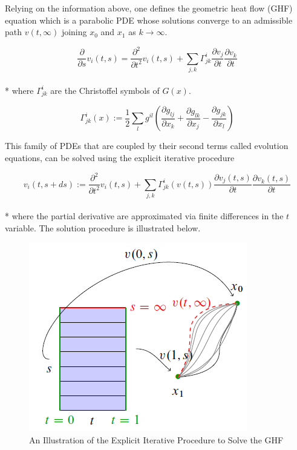 \documentclass[letterpaper, 10 pt, conference]{ieeeconf}
\begin{document}
Relying on the information above, one defines the geometric heat flow (GHF) equation which is a parabolic PDE whose solutions converge to an admissible path $v(t, \infty)$ joining $x_0$ and $x_1$ as $k \rightarrow \infty$.

\begin{equation}
\frac{\partial}{\partial s} v_{i}(t, s)=\frac{\partial^{2}}{\partial t^{2}} v_{i}(t, s)+\sum_{j, k} \Gamma_{j k}^{i} \frac{\partial v_{j}}{\partial t} \frac{\partial v_{k}}{\partial t}
\end{equation}
\\*
where $\Gamma_{j k}^{i}$ are the Christoffel symbols of $G(x)$.

\begin{equation}
\Gamma_{j k}^{i}(x):=\frac{1}{2} \sum_{l} g^{i l}\left(\frac{\partial g_{l j}}{\partial x_{k}}+\frac{\partial g_{l k}}{\partial x_{j}}-\frac{\partial g_{j k}}{\partial x_{l}}\right)
\end{equation}

This family of PDEs that are coupled by their second terms called evolution equations, can be solved using the explicit iterative procedure

\begin{equation}
v_{i}(t, s+d s):=\frac{\partial^{2}}{\partial t^{2}} v_{i}(t, s) 
+\sum_{j, k} \Gamma_{j k}^{i}(v(t, s)) \frac{\partial v_{j}(t, s)}{\partial t} \frac{\partial v_{k}(t, s)}{\partial t}
\end{equation}
\\*
where the partial derivative are approximated via finite differences in the $t$ variable. The solution procedure is illustrated below.
\begin{figure}[htbp]
\centering
\captionsetup{justification=centering}
\centerline{\includegraphics[scale=.45]{procedure.png}}
\caption{An Illustration of the Explicit Iterative Procedure to Solve the GHF \cite{PAPER1}}
\label{fig}
\end{figure}
\end{document}
